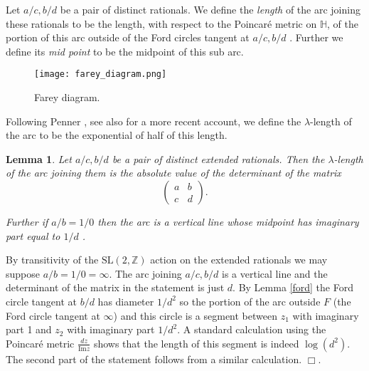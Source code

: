 \documentclass[12pt,a4paper]{amsart}
\newtheorem{lem}[thm]{Lemma}
\def\HH{\mathbb{H}}
\def\xx{\HH/g2}
\def\ZZ{\mathbb{Z}}
\def\sl2{\mathrm{SL}(2, \ZZ)}
\def\g2{\Gamma(2)}
\def\xx{\HH/\g2}
\begin{document}


Let $a/c, b/d$ be a pair of distinct rationals.
We define the \textit{length} of the arc 
joining these rationals 
to be the length, with respect to the Poincar\'e metric on $\HH$, 
of the portion of this arc 
outside of the Ford circles tangent at $a/c, b/d$ .
Further we define its  \textit{mid point} to be the midpoint of this sub arc.

\begin{figure}[ht]
\begin{center}
\texttt{[image: farey\_diagram.png]} 
\end{center}
\caption{Farey diagram.}
\label{farey diagram}
\end{figure}


Following Penner \cite{bob}, 
see also \cite{spring} for a more recent account,
we define the
$\lambda$-length of the arc to be the exponential of half
of this length.

\begin{lem}\label{calcul}
Let $a/c, b/d$ be a pair of distinct extended rationals.
Then the  $\lambda$-length of the arc joining them
 is the absolute value of the determinant of the matrix
$$\begin{pmatrix}
a & b \\ c & d
\end{pmatrix}.$$

Further if $a/b = 1/0$ then the arc is a vertical line 
 whose midpoint has imaginary part equal to $1/d$ .
\end{lem}

\proof
By transitivity of the $\sl2$ action on the extended rationals
we may suppose $a/b = 1/0 = \infty$.
The arc joining $a/c, b/d$ is a vertical line and 
the determinant of the matrix in the statement  is just $d$.
By Lemma \ref{ford} the Ford circle tangent at $b/d$ 
has diameter $1/d^2$ so the portion of the arc 
outside $F$ (the Ford circle tangent at $\infty$) 
and this circle is a segment between $z_1$ with imaginary part 1
and $z_2$ with imaginary part $1/d^2$.
A standard calculation using the Poincaré metric $\frac{dz}{\mathrm{Im} z}$
shows that the length of this segment is indeed $\log (d^2)$. 
The second part of the statement follows from a similar calculation.
\hfill $\Box$.
\end{document}
